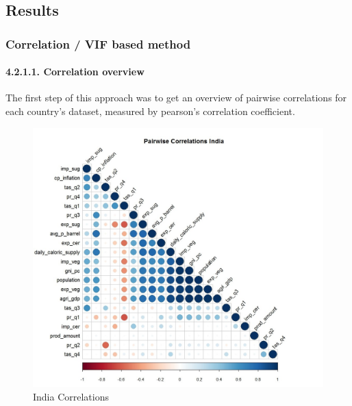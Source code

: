 \documentclass[12pt,a4paper,english]{article}
\begin{document}
\subsection{Results}

\subsubsection{Correlation / VIF based method}

\paragraph{4.2.1.1. Correlation overview}
The first step of this approach was to get an overview of pairwise correlations for each country’s dataset, measured by pearson’s correlation coefficient.


\begin{figure}[!htb]
\begin{center}
\includegraphics[scale=0.5]{R1.jpg}
\caption{India Correlations}
\label{figure6}
\end{center}
\end{figure}
\end{document}
